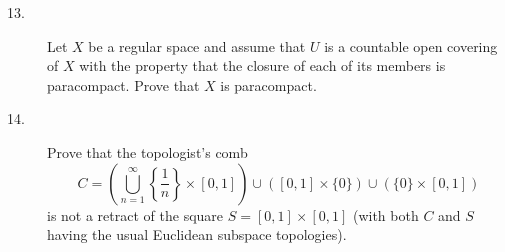 \documentclass{article}
\begin{document}
\begin{description}
\item[13.]
Let $X$ be a regular space and assume that $U$ is a countable open covering
of $X$ with the property that the closure of each of its members is
paracompact. Prove that $X$ is paracompact.

\item[14.]
Prove that the topologist's comb
$$C=\left( \bigcup^\infty_{n=1} \left\{ \frac{1}{n}\right\}
  \times [0,1] \right) \cup \left([0,1] \times \{0\} \right) \cup
  \left(\{0\} \times [0,1] \right)$$
is not a retract of the square $S = [0,1] \times [0,1]$ (with both $C$ and
$S$ having the usual Euclidean subspace topologies).
  




    
\end{description}
\end{document}
